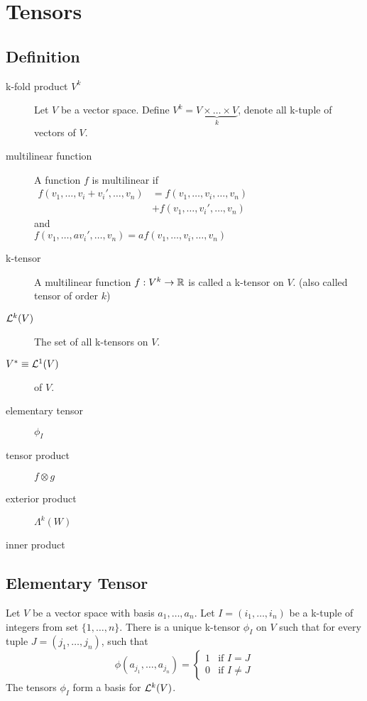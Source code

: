 \section{Tensors}

\secttoc

\subsection{Definition}

\begin{description}
\item[k-fold product $V^k$]
Let $V$ be a vector space. Define $V^k=\underbrace{V\times\ldots\times V}_{k}$, denote all k-tuple of vectors of $V$.
\item[multilinear function]
A function $f$ is multilinear if\\
$\begin{aligned}f(v_1, \ldots, v_i+v_i',\ldots, v_n)
                & = f(v_1, \ldots, v_i,\ldots, v_n)\\
                & + f(v_1, \ldots, v_i',\ldots, v_n)\end{aligned}$\\
and\\
$f(v_1, \ldots, av_i',\ldots, v_n)
  = af(v_1, \ldots, v_i,\ldots, v_n)$
\item[k-tensor] A multilinear function $f:V^k\to{\mathbb R}$ is called a k-tensor on $V$. (also called tensor of order $k$)
\item[${\mathcal L}^k(V)$] The set of all k-tensors on $V$.
\item[$V^*\equiv {\mathcal L}^1(V)$]  of $V$.
\item[elementary tensor] $\phi_I$
\item[tensor product] $f\otimes g$
\item[exterior product] $\Lambda^k(W)$
\end{description}


\TODO inner product
\subsection{Elementary Tensor}

Let $V$ be a vector space with basis $a_1, \ldots, a_n$.
Let $I=(i_1, \ldots, i_n)$ be a k-tuple of integers from set $\{1,\ldots, n\}$.
There is a unique k-tensor $\phi_I$ on $V$ such that for every tuple $J=(j_1, \ldots, j_n)$, such that
\[\phi(a_{j_1},\ldots,a_{j_n})=\begin{cases}1&\text{if }I=J\\0&\text{if }I\neq J\end{cases}\]
The tensors $\phi_I$ form a basis for ${\mathcal L}^k(V)$.

